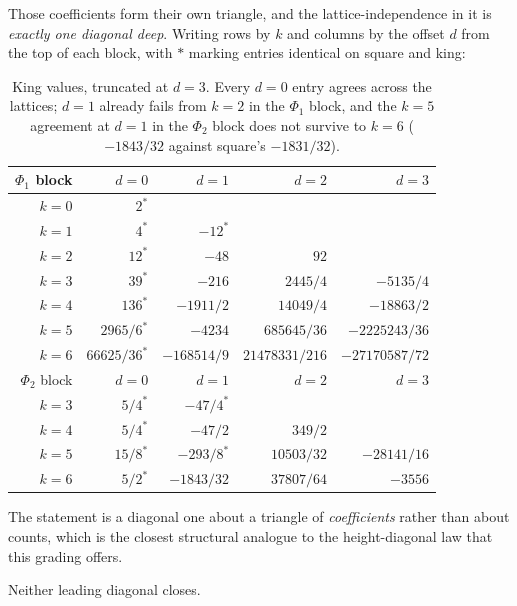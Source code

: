 \documentclass[11pt]{article}
\newcommand{\Phid}{\Phi}
\begin{document}
Those coefficients form their own triangle, and the lattice-independence in it
is \emph{exactly one diagonal deep}. Writing rows by $k$ and columns by the
offset $d$ from the top of each block, with $\ast$ marking entries identical on
square and king:

\begin{table}[H]
\centering\small
\begin{tabular}{r r r r r}
\toprule
$\Phid_1$ block & $d=0$ & $d=1$ & $d=2$ & $d=3$ \\
\midrule
$k=0$ & $2^\ast$ & & & \\
$k=1$ & $4^\ast$ & $-12^\ast$ & & \\
$k=2$ & $12^\ast$ & $-48$ & $92$ & \\
$k=3$ & $39^\ast$ & $-216$ & $2445/4$ & $-5135/4$ \\
$k=4$ & $136^\ast$ & $-1911/2$ & $14049/4$ & $-18863/2$ \\
$k=5$ & $2965/6^\ast$ & $-4234$ & $685645/36$ & $-2225243/36$ \\
$k=6$ & $66625/36^\ast$ & $-168514/9$ & $21478331/216$ & $-27170587/72$ \\
\midrule
$\Phid_2$ block & $d=0$ & $d=1$ & $d=2$ & $d=3$ \\
\midrule
$k=3$ & $5/4^\ast$ & $-47/4^\ast$ & & \\
$k=4$ & $5/4^\ast$ & $-47/2$ & $349/2$ & \\
$k=5$ & $15/8^\ast$ & $-293/8^\ast$ & $10503/32$ & $-28141/16$ \\
$k=6$ & $5/2^\ast$ & $-1843/32$ & $37807/64$ & $-3556$ \\
\bottomrule
\end{tabular}
\caption{King values, truncated at $d = 3$. Every $d = 0$ entry agrees across
the lattices; $d = 1$ already fails from $k = 2$ in the $\Phid_1$ block, and the
$k = 5$ agreement at $d = 1$ in the $\Phid_2$ block does not survive to
$k = 6$ ($-1843/32$ against square's $-1831/32$).}
\label{tab:coefftri}
\end{table}

The statement is a diagonal one about a triangle of \emph{coefficients} rather
than about counts, which is the closest structural analogue to the
height-diagonal law that this grading offers.

Neither leading diagonal closes.
\end{document}
